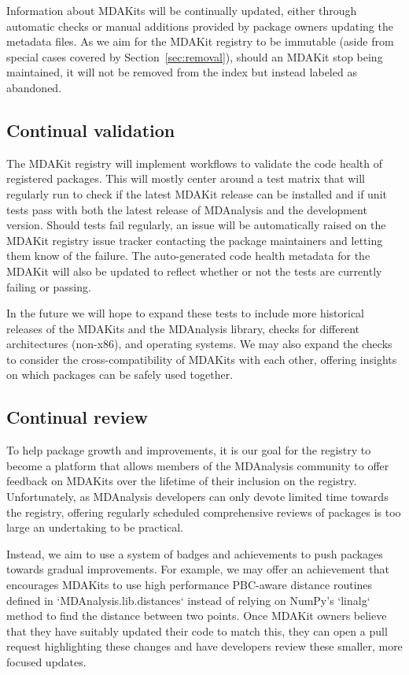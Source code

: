 \documentclass[9pt,whitepaper]{livecoms}
\begin{document}
Information about MDAKits will be continually updated, either through automatic checks or manual additions provided by package owners updating the metadata files. As we aim for the MDAKit registry to be immutable (aside from special cases covered by Section~\ref{sec:removal}), should an MDAKit stop being maintained, it will not be removed from the index but instead labeled as abandoned.

\subsection{Continual validation}
\label{sec:continualvalidation}

The MDAKit registry will implement workflows to validate the code health of registered packages. This will mostly center around a test matrix that will regularly run to check if the latest MDAKit release can be installed and if unit tests pass with both the latest release of MDAnalysis and the development version. Should tests fail regularly, an issue will be automatically raised on the MDAKit registry issue tracker contacting the package maintainers and letting them know of the failure. The auto-generated code health metadata for the MDAKit will also be updated to reflect whether or not the tests are currently failing or passing.

In the future we will hope to expand these tests to include more historical releases of the MDAKits and the MDAnalysis library, checks for different architectures (non-x86), and operating systems. We may also expand the checks to consider the cross-compatibility of MDAKits with each other, offering insights on which packages can be safely used together.

\subsection{Continual review}
\label{sec:continualreview}

To help package growth and improvements, it is our goal for the registry to become a platform that allows members of the MDAnalysis community to offer feedback on MDAKits over the lifetime of their inclusion on the registry. Unfortunately, as MDAnalysis developers can only devote limited time towards the registry, offering regularly scheduled comprehensive reviews of packages is too large an undertaking to be practical.


Instead, we aim to use a system of badges and achievements to push packages towards gradual improvements. For example, we may offer an achievement that encourages MDAKits to use high performance PBC-aware distance routines defined in `MDAnalysis.lib.distances` instead of relying on NumPy’s `linalg` method to find the distance between two points. Once MDAKit owners believe that they have suitably updated their code to match this, they can open a pull request highlighting these changes and have developers review these smaller, more focused updates.
\end{document}
